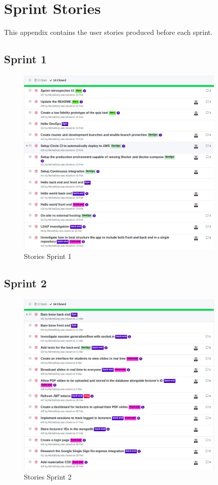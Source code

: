 \chapter{Sprint Stories}
\label{chap:spintstories}

This appendix contains the user stories produced before each sprint.

\section{Sprint 1}
\begin{figure}[ht]
    \centering
    \includegraphics[width=0.9\textwidth]{Appendix3/1.jpg}
    \caption{Stories Sprint 1}
    \label{fig:sprintstories1}
\end{figure}

\newpage
\section{Sprint 2}
\begin{figure}[ht]
    \centering
    \includegraphics[width=0.9\textwidth]{Appendix3/2.jpg}
    \caption{Stories Sprint 2}
    \label{fig:sprintstories2}
\end{figure}
